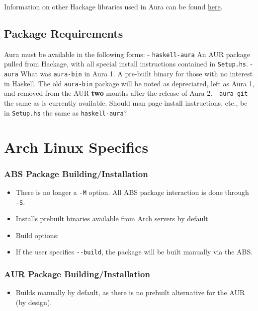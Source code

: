 \documentclass{article}
\begin{document}
Information on other Hackage libraries used in Aura can be found
\href{https://github.com/fosskers/aura/issues/223}{here}.

\subsection{Package Requirements}\label{package-requirements}

Aura must be available in the following forms: - \texttt{haskell-aura}
An AUR package pulled from Hackage, with all special install
instructions contained in \texttt{Setup.hs}. - \texttt{aura} What was
\texttt{aura-bin} in Aura 1. A pre-built binary for those with no
interest in Haskell. The old \texttt{aura-bin} package will be noted as
depreciated, left as Aura 1, and removed from the AUR \textbf{two}
months after the release of Aura 2. - \texttt{aura-git} the same as is
currently available. Should man page install instructions, etc., be in
\texttt{Setup.hs} the same as \texttt{haskell-aura}?

\section{Arch Linux Specifics}\label{arch-linux-specifics}

\subsubsection{ABS Package
Building/Installation}\label{abs-package-buildinginstallation}

\begin{itemize}
\itemsep1pt\parskip0pt
\item
  There is no longer a \texttt{-M} option. All ABS package interaction
  is done through \texttt{-S}.
\item
  Installs prebuilt binaries available from Arch servers by default.
\item
  Build options:
\item
  If the user specifies \texttt{-\/-build}, the package will be built
  manually via the ABS.
\end{itemize}

\subsubsection{AUR Package
Building/Installation}\label{aur-package-buildinginstallation}

\begin{itemize}
\itemsep1pt\parskip0pt
\item
  Builds manually by default, as there is no prebuilt alternative for
  the AUR (by design).
\end{itemize}
\end{document}
